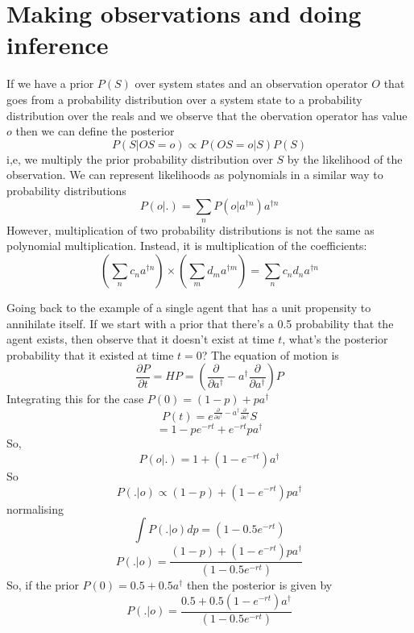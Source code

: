 \documentclass[letterpaper,twocolumn,10pt]{article}
\begin{document}
\begin{comment}
Given this, we can represent any probability density that has finite information as a probability mass function over a finite number of variables. For example, if the PDF has a compact support, a convenient representation would be as a Bernstein polynomial, a Deselby polynomial or the spectral modes.

[TODO: find good bases that make the mapping simple from agent to aggregate behaviour]

\subsection{Mixed real/integer states}
 We can create a fully general system state that can deal with mixed real and integer agent states by defining the state to be a function from bags of state vectors to real coefficients.
 \[
 P = \int_{\Psi\in\mathcal{P}(\psi)} f(\Psi)
 \]
\end{comment}
\section{Making observations and doing inference}

If we have a prior $P(S)$ over system states and an observation operator $O$ that goes from a probability distribution over a system state to a probability distribution over the reals and we observe that the obervation operator has value $o$ then we can define the posterior
\[
P(S|OS = o) \propto P(OS=o|S)P(S)
\]
i,e, we multiply the prior probability distribution over $S$ by the likelihood of the observation. We can represent likelihoods as polynomials in a similar way to probability distributions
\[
P(o|.) = \sum_n P(o|a^{\dag n})a^{\dag n}
\]
However, multiplication of two probability distributions is not the same as polynomial multiplication. Instead, it is multiplication of the coefficients:
\[
\left(\sum_n c_n a^{\dag n}\right) \times \left(\sum_m d_m a^{\dag m}\right) = \sum_n c_nd_n a^{\dag n}
\]

Going back to the example of a single agent that has a unit propensity to annihilate itself. If we start with a prior that there's a 0.5 probability that the agent exists, then observe that it doesn't exist at time $t$, what's the posterior probability that it existed at time $t=0$? The equation of motion is
\[
\frac{\partial P}{\partial t} = HP = \left(\frac{\partial}{\partial a^\dag} - a^\dag \frac{\partial }{\partial a^\dag}\right)P
\]
Integrating this for the case $P(0) = (1-p) + pa^\dag$
\[
P(t) = e^{\frac{\partial}{\partial a^\dag} - a^\dag \frac{\partial }{\partial a^\dag}}S
\]
\[
= 1-pe^{-rt} + e^{-rt}pa^\dag
\]
So,
\[
P(o|.) = 1 + (1-e^{-rt})a^\dag
\]
So
\[
P(.|o) \propto (1-p) + (1-e^{-rt})pa^\dag
\]
normalising
\[
\int P(.|o) dp = (1-0.5e^{-rt})
\]
\[
P(.|o) = \frac{(1-p) + (1-e^{-rt})pa^\dag}{(1-0.5e^{-rt})}
\]
So, if the prior $P(0) = 0.5 + 0.5a^\dag$ then the posterior is given by
\[
P(.|o) = \frac{0.5 + 0.5(1-e^{-rt})a^\dag}{(1-0.5e^{-rt})}
\]
\end{document}
